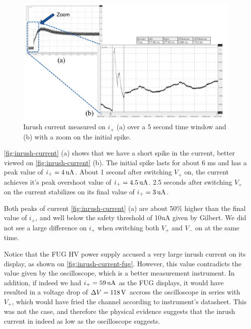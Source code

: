 \documentclass[oneside,12pt]{article}
\begin{document}
\begin{figure}[h!]
    \centering
    \includegraphics[width=\textwidth,trim=1 1 1 1,clip]{figures/inrush-current.png}
    \caption{Inrush current measured on $i_+$ (a) over a 5 second time window and (b) with a zoom on the initial spike.}
    \label{fig:inrush-current}
\end{figure}

\autoref{fig:inrush-current} (a) shows that we have a short spike in the current, better viewed on \autoref{fig:inrush-current} (b).
The initial spike lasts for about 6 ms and has a peak value of $i_+ = 4 \,\mathrm{uA}$. About 1 second after switching $V_+$ on, the
current achieves it's peak overshoot value of $i_+ = 4.5 \,\mathrm{uA}$. 2.5 seconds after switching $V_+$ on the current stabilizes 
on its final value of $i_+ = 3 \,\mathrm{uA}$.

Both peaks of current \autoref{fig:inrush-current} (a) are about 50\% higher than the final value of $i_+$, and well below the 
safety threshold of 10uA given by Gilbert. We did not see a large difference on $i_+$ when switching both $V_+$ and $V_-$ on at the 
same time. 

Notice that the FUG HV power supply accused a very large inrush current on its display, as shown on \autoref{fig:inrush-current-fug}.
However, this value contradicts the value given by the oscilloscope, which is a better measurement instrument. In addition, if
indeed we had $i_+ = 59 \,\mathrm{uA}$ as the FUG displays, it would have resulted in a voltage drop of $\Delta V = 118 \,\mathrm{V}$ accross the 
oscilloscope in series with $V_+$, which would have fried the channel according to instrument's datasheet. This was not the case, 
and therefore the physical evidence suggests that the inrush current in indeed as low as the oscilloscope suggests. 
\end{document}
